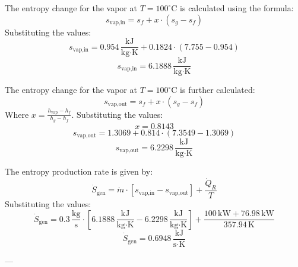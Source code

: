 The entropy change for the vapor at \( T = 100^\circ\text{C} \) is calculated using the formula:  
\[
s_{\text{vap,in}} = s_f + x \cdot (s_g - s_f)
\]  
Substituting the values:  
\[
s_{\text{vap,in}} = 0.954 \, \frac{\text{kJ}}{\text{kg·K}} + 0.1824 \cdot (7.755 - 0.954)
\]  
\[
s_{\text{vap,in}} = 6.1888 \, \frac{\text{kJ}}{\text{kg·K}}
\]  

The entropy change for the vapor at \( T = 100^\circ\text{C} \) is further calculated:  
\[
s_{\text{vap,out}} = s_f + x \cdot (s_g - s_f)
\]  
Where \( x = \frac{h_{\text{vap}} - h_f}{h_g - h_f} \). Substituting the values:  
\[
x = 0.8143
\]  
\[
s_{\text{vap,out}} = 1.3069 + 0.814 \cdot (7.3549 - 1.3069)
\]  
\[
s_{\text{vap,out}} = 6.2298 \, \frac{\text{kJ}}{\text{kg·K}}
\]  

The entropy production rate is given by:  
\[
\dot{S}_{\text{gen}} = \dot{m} \cdot \left[ s_{\text{vap,in}} - s_{\text{vap,out}} \right] + \frac{\dot{Q}_R}{T}
\]  
Substituting the values:  
\[
\dot{S}_{\text{gen}} = 0.3 \, \frac{\text{kg}}{\text{s}} \cdot \left[ 6.1888 \, \frac{\text{kJ}}{\text{kg·K}} - 6.2298 \, \frac{\text{kJ}}{\text{kg·K}} \right] + \frac{100 \, \text{kW} + 76.98 \, \text{kW}}{357.94 \, \text{K}}
\]  
\[
\dot{S}_{\text{gen}} = 0.6948 \, \frac{\text{kJ}}{\text{s·K}}
\]  

---